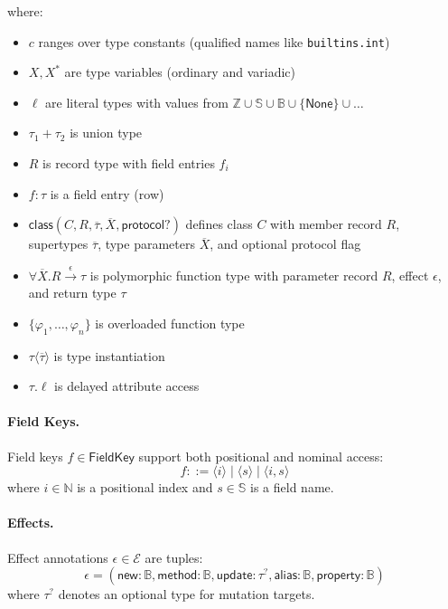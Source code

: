 where:
\begin{itemize}
\item $c$ ranges over type constants (qualified names like \texttt{builtins.int})
\item $X, X^*$ are type variables (ordinary and variadic)  
\item $\ell$ are literal types with values from $\mathbb{Z} \cup \mathbb{S} \cup \mathbb{B} \cup \{\mathsf{None}\} \cup \ldots$
\item $\tau_1 + \tau_2$ is union type
\item $R$ is record type with field entries $f_i$
\item $f : \tau$ is a field entry (row)
\item $\mathsf{class}(C, R, \overline{\tau}, \overline{X}, \mathsf{protocol}?)$ defines class $C$ with member record $R$, supertypes $\overline{\tau}$, type parameters $\overline{X}$, and optional protocol flag
\item $\forall \overline{X}.R \xrightarrow{\epsilon} \tau$ is polymorphic function type with parameter record $R$, effect $\epsilon$, and return type $\tau$
\item $\{\varphi_1, \ldots, \varphi_n\}$ is overloaded function type
\item $\tau\langle\overline{\tau}\rangle$ is type instantiation
\item $\tau.\ell$ is delayed attribute access
\end{itemize}

\paragraph{Field Keys.} Field keys $f \in \mathsf{FieldKey}$ support both positional and nominal access:
\[f ::= \langle i \rangle \mid \langle s \rangle \mid \langle i, s \rangle\]
where $i \in \mathbb{N}$ is a positional index and $s \in \mathbb{S}$ is a field name.

\paragraph{Effects.} Effect annotations $\epsilon \in \mathcal{E}$ are tuples:
\[\epsilon = (\mathsf{new} : \mathbb{B}, \mathsf{method} : \mathbb{B}, \mathsf{update} : \tau^?, \mathsf{alias} : \mathbb{B}, \mathsf{property} : \mathbb{B})\]
where $\tau^?$ denotes an optional type for mutation targets.

